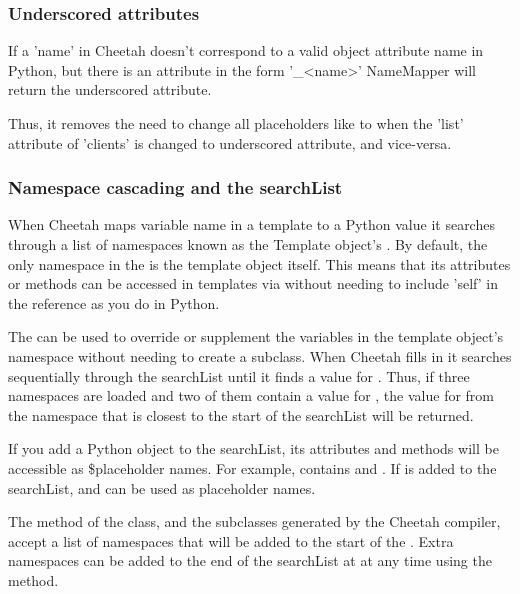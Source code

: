 \subsubsection{Underscored attributes}
\label{language.namemapper.underscore}

If a 'name' in Cheetah doesn't correspond to a valid object attribute name in
Python, but there is an attribute in the form '_<name>' NameMapper will return
the underscored attribute.

Thus, it removes the need to change all placeholders like  to
 when the 'list' attribute of 'clients' is changed to underscored
attribute, and vice-versa.


\subsubsection{Namespace cascading and the searchList}
\label{language.namemapper.searchList}

When Cheetah maps variable name in a template to a Python value it searches
through a list of namespaces known as the Template object's .
By default, the only namespace in the  is the template object
itself. This means that its attributes or methods can be accessed in templates
via  without needing to include 'self' in the reference as
you do in Python. 


The  can be used to override or supplement the variables in the
template object's namespace without needing to create a subclass.  When Cheetah
fills in  it searches sequentially through the searchList until it
finds a value for .  Thus, if three namespaces are loaded and two of
them contain a value for , the value for  from the
namespace that is closest to the start of the searchList will be returned.

If you add a Python object to the searchList, its attributes and methods will be
accessible as \$placeholder names.  For example,  contains
 and .  If  is added to the
searchList,  and  can be used as placeholder
names.

The method of the  class, and the subclasses
generated by the Cheetah compiler, accept a list of namespaces that will be
added to the start of the .  Extra namespaces can be added to
the end of the searchList at at any time using the
 method.

